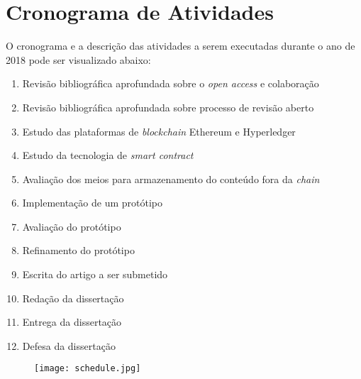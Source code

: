 \chapter{Cronograma de Atividades}

O cronograma e a descrição das atividades a serem executadas durante o ano de 2018 pode ser visualizado abaixo:
\begin{enumerate}
  \item Revisão bibliográfica aprofundada sobre o \textit{open access} e colaboração
  \item Revisão bibliográfica aprofundada sobre processo de revisão aberto
  \item Estudo das plataformas de \textit{blockchain} Ethereum e Hyperledger
  \item Estudo da tecnologia de \textit{smart contract}
  \item Avaliação dos meios para armazenamento do conteúdo fora da \textit{chain}
  \item Implementação de um protótipo
  \item Avaliação do protótipo
  \item Refinamento do protótipo
  \item Escrita do artigo a ser submetido
  \item Redação da dissertação
  \item Entrega da dissertação
  \item Defesa da dissertação
\end{enumerate}
\begin{figure}[!h]
    \centering
    \texttt{[image: schedule.jpg]}
\end{figure}
